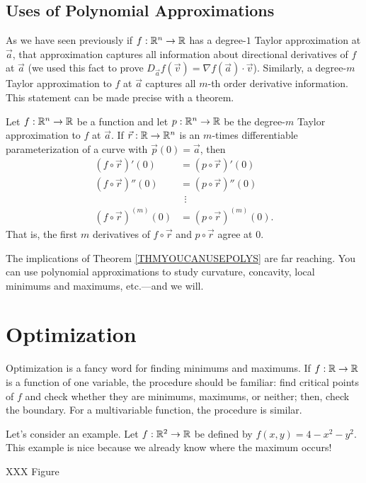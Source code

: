 \subsection{Uses of Polynomial Approximations}
As we have seen previously if $f:\mathbb{R}^n\to\mathbb{R}$
has a degree-$1$ Taylor approximation at $\vec a$,
that approximation captures
all information about directional derivatives of $f$ at $\vec a$ 
(we used this fact to prove $D_{\vec a} f(\vec v)=\nabla f(\vec a)\cdot \vec v$).
Similarly, a degree-$m$ Taylor approximation to $f$ at $\vec a$ captures
all $m$-th order derivative information.  This statement can be made
precise with a theorem.

\begin{theorem}
	\label{THMYOUCANUSEPOLYS}
	Let $f:\mathbb{R}^n\to\mathbb{R}$ be a function and let $p:\mathbb{R}^n\to\mathbb{R}$ be the 
	degree-$m$ Taylor approximation to $f$ at $\vec a$.  If
	$\vec r:\mathbb{R}\to\mathbb{R}^n$ is an
	$m$-times differentiable parameterization of a curve with $\vec p(0)=\vec a$,
	then
	\begin{align*}
		(f\circ \vec r)'(0)&=(p\circ \vec r)'(0)\\
		(f\circ \vec r)''(0)&=(p\circ \vec r)''(0)\\
		&\ \ \vdots \\
		(f\circ \vec r)^{(m)}(0)&=(p\circ \vec r)^{(m)}(0).
	\end{align*}
	That is, the first $m$ derivatives of $f\circ \vec r$ and $p\circ\vec r$ agree
	at $0$.
\end{theorem}

The implications of Theorem \ref{THMYOUCANUSEPOLYS} are far reaching. 
You can use polynomial approximations to study curvature, concavity, local
minimums and maximums, etc.---and we will.


\section{Optimization}

Optimization is a fancy word for finding minimums and maximums.  If
$f:\mathbb{R}\to\mathbb{R}$ is a function of one variable, the procedure should be
familiar: find critical points of $f$ and check whether they are
minimums, maximums, or neither; then, check the boundary.  For
a multivariable function, the procedure is similar.

Let's consider an example.  Let $f:\mathbb{R}^2\to\mathbb{R}$ be defined by $f(x,y)=4-x^2-y^2$.
This example is nice because we already know where the maximum occurs!

XXX Figure

